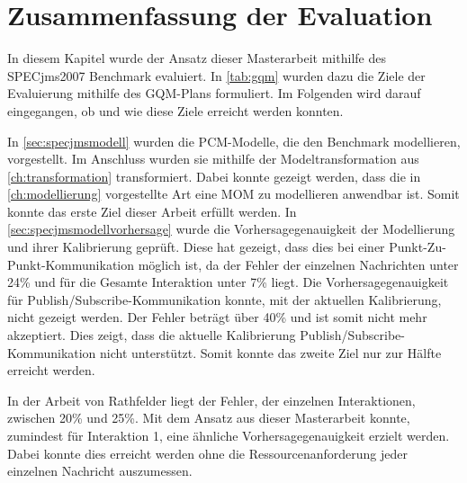 \section{Zusammenfassung der Evaluation}
\label{sec:evaluationzusammenfassung}
In diesem Kapitel wurde der Ansatz dieser Masterarbeit mithilfe des SPECjms2007 Benchmark evaluiert. In \autoref{tab:gqm} wurden dazu die Ziele der Evaluierung mithilfe des GQM-Plans formuliert. Im Folgenden wird darauf eingegangen, ob und wie diese Ziele erreicht werden konnten. \par
In \autoref{sec:specjmsmodell} wurden die PCM-Modelle, die den Benchmark modellieren, vorgestellt. Im Anschluss wurden sie mithilfe der Modeltransformation aus \autoref{ch:transformation} transformiert. Dabei konnte gezeigt werden, dass die in \autoref{ch:modellierung} vorgestellte Art eine MOM zu modellieren anwendbar ist. Somit konnte das erste Ziel dieser Arbeit erfüllt werden. 
In \autoref{sec:specjmsmodellvorhersage} wurde die Vorhersagegenauigkeit der Modellierung und ihrer Kalibrierung geprüft. Diese hat gezeigt, dass dies bei einer Punkt-Zu-Punkt-Kommunikation möglich ist, da der Fehler der einzelnen Nachrichten unter 24\% und für die Gesamte Interaktion unter 7\% liegt. Die Vorhersagegenauigkeit für Publish/Subscribe-Kommunikation konnte, mit der aktuellen Kalibrierung, nicht gezeigt werden. Der Fehler beträgt über 40\% und ist somit nicht mehr akzeptiert. Dies zeigt, dass die aktuelle Kalibrierung Publish/Subscribe-Kommunikation nicht unterstützt. Somit konnte das zweite Ziel nur zur Hälfte erreicht werden. \par
In der Arbeit von Rathfelder \cite{Rathfelder2013} liegt der Fehler, der einzelnen Interaktionen, zwischen 20\% und 25\%. Mit dem Ansatz aus dieser Masterarbeit konnte, zumindest für Interaktion 1, eine ähnliche Vorhersagegenauigkeit erzielt werden. Dabei konnte dies erreicht werden ohne die Ressourcenanforderung jeder einzelnen Nachricht auszumessen. 



